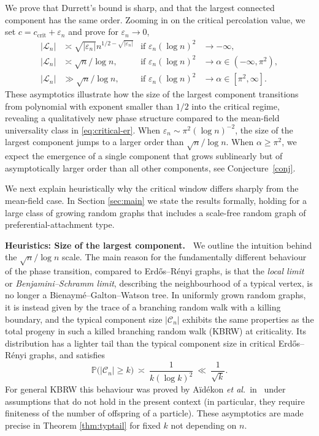 \documentclass[a4paper, a4wide, 10pt, reqno]{amsart}
\theoremstyle{plain}
\theoremstyle{definition}
\numberwithin{equation}{section}
\newcommand{\Prob}{\mathbb{P}}
\newcommand{\sC}{{\mathscr C}}
\newcommand{\sL}{{\mathscr L}}
\begin{document}
\smallskip
We prove that Durrett's bound is sharp, and  that the largest connected component has the same order. 
Zooming in on the critical percolation value, we set $c=c_\mathrm{crit}+\varepsilon_n$ and prove for $\varepsilon_n\to0$,
\begin{align}
    |\sL_n|&\asymp \sqrt{|\varepsilon_n|}n^{1/2-\sqrt{|\varepsilon_n|}} &\text{if }\varepsilon_n(\log n)^2&\to-\infty, \nonumber\\
    |\sL_n|&\asymp \sqrt{n}/\log n,&\text{if }\varepsilon_n(\log n)^2&\to\alpha\in(-\infty,\pi^2),\label{eq:critical-window-intro}\\
    |\sL_n|&\gg \sqrt{n}/\log n,&\text{if }\varepsilon_n(\log n)^2&\to\alpha\in[\pi^2,\infty].\nonumber
\end{align}
These asymptotics illustrate how the size of the largest component transitions from polynomial with exponent smaller than $1/2$ into the critical regime, revealing a qualitatively new phase structure compared to the mean-field universality class in \eqref{eq:critical-er}.
When $\varepsilon_n\sim \pi^2(\log n)^{-2}$,
the size of the largest  component jumps to a larger order than $\sqrt{n}/\log n$.  When $\alpha \ge \pi^2$, we expect 
the emergence of a single component that grows sublinearly but of asymptotically larger order than all other components, 
see  Conjecture~\ref{conj}.

\smallskip
We next explain heuristically why the critical window differs sharply from the mean-field case. In Section \ref{sec:main} we state the results formally, holding for a large class of growing random graphs that  includes a scale-free random graph of preferential-attachment type.

\medskip
\noindent\textbf{Heuristics: Size of the largest component.\ } We outline the intuition behind the $\sqrt{n}/\log n$ scale.
The main reason for the fundamentally different behaviour of the phase transition, compared to Erd\H{o}s--R\'enyi graphs, is that the  \emph{local limit} or \emph{Benjamini--Schramm limit}, describing the neighbourhood of a typical vertex, is no longer  
a Bienaym\'e--Galton--Watson tree. In uniformly grown random graphs, it is 
instead given by
the trace of a branching random walk with a killing boundary, and the typical component size $|\sC_n|$ exhibits the same properties as the  total progeny in such a killed branching random walk (KBRW) at criticality. Its distribution has a lighter tail than the typical component size in critical Erd\H{o}s--R\'enyi graphs, and satisfies 
\[
\Prob\big(|\sC_n|\ge k\big)\ \asymp \ \frac{1}{k(\log k)^2}\ \ll\ \frac{1}{\sqrt{k}}.
\]
For general KBRW this behaviour was proved  by A\"id\'ekon \emph{et al.}\ in~\cite{AidekonHuZindy} under assumptions that do not hold in the present context (in particular, they require finiteness of the number of offspring of a particle). These asymptotics are made precise in Theorem \ref{thm:typtail} for fixed $k$ not depending on $n$.
\end{document}
